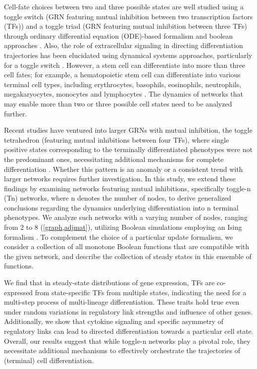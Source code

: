 \documentclass[11pt,a4paper]{article}
\theoremstyle{definition}
\theoremstyle{remark}
\begin{document}
Cell-fate choices between two and three possible states are well studied using a toggle switch (GRN featuring mutual inhibition between two transcription factors (TFs)) and a toggle triad (GRN featuring mutual inhibition between three TFs) through ordinary differential equation (ODE)-based formalism \parencite{gardner_construction_2000, tian_stochastic_2006, ma_robustness_2006, yang_coexistence_2021, duddu_multi-stability_2020} and boolean approaches \parencite{zhou_relative_2016, masashi_behavior_2017, hari_emergent_2022}. Also, the role of extracellular signaling in directing differentiation trajectories has been elucidated using dynamical systems approaches, particularly for a toggle switch \parencite{wang_epithelial--mesenchymal_2022, pezzotta_optimal_2023}. However, a stem cell can differentiate into more than three cell fates; for example, a hematopoietic stem cell can differentiate into various terminal cell types, including erythrocytes, basophils, eosinophils, neutrophils, megakaryocytes, monocytes and lymphocytes \parencite{laurenti_haematopoietic_2018, zhou_understanding_2011}. The dynamics of networks that may enable more than two or three possible cell states need to be analyzed further.

Recent studies have ventured into larger GRNs with mutual inhibition, the toggle tetrahedron (featuring mutual inhibitions between four TFs), where single positive states corresponding to the terminally differentiated phenotypes were not the predominant ones, necessitating additional mechanisms for complete differentiation \parencite{hong_mathematical_2015, duddu_multistability_2024}. Whether this pattern is an anomaly or a consistent trend with larger networks requires further investigation. In this study, we extend these findings by examining networks featuring mutual inhibitions, specifically toggle-n (Tn) networks, where n denotes the number of nodes, to derive generalized conclusions regarding the dynamics underlying differentiation into n terminal phenotypes. We analyze such networks with a varying number of nodes, ranging from 2 to 8 (\cref{graph,adjmat}), utilizing Boolean simulations employing an Ising formalism \parencite{font-clos_topography_2018}. To complement the choice of a particular update formalism, we consider a collection of all monotone Boolean functions that are compatible with the given network, and describe the collection of steady states in this ensemble of functions.

We find that in steady-state distributions of gene expression, TFs  are co-expressed from state-specific TFs from multiple states, indicating the need for a multi-step process of multi-lineage differentiation. These traits hold true even under random variations in regulatory link strengths and influence of other genes. Additionally, we show that cytokine signaling and specific asymmetry of regulatory links can lead to directed differentiation towards a particular cell state. Overall, our results suggest that while toggle-n networks play a pivotal role, they necessitate additional mechanisms to effectively orchestrate the trajectories of (terminal) cell differentiation.
\end{document}
